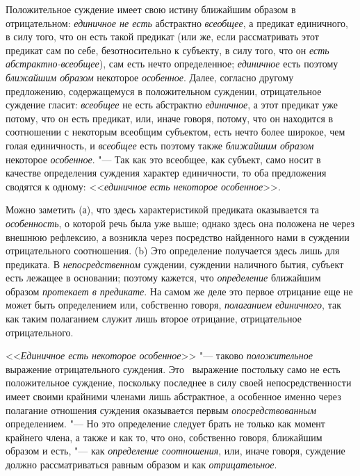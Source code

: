 {Положительное суждение имеет свою истину ближайшим образом в
отрицательном: {\em единичное не есть}
абстрактно
{\em всеобщее}, а
предикат единичного, в силу того, что он есть такой предикат (или же, если
рассматривать этот предикат сам по себе, безотносительно к субъекту, в силу
того, что он {\em есть
абстрактно-всеобщее}), сам есть нечто определенное;
{\em единичное} есть
поэтому {\em ближайшим образом}
некоторое
{\em особенное}. Далее,
согласно другому предложению, содержащемуся в положительном суждении,
отрицательное суждение гласит:
{\em всеобщее} не есть
абстрактно {\em единичное},
а этот предикат уже потому, что он есть предикат, или, иначе
говоря, потому, что он находится в соотношении с некоторым всеобщим
субъектом, есть нечто более широкое, чем голая единичность, и
{\em всеобщее} есть
поэтому также {\em ближайшим образом}
некоторое
{\em особенное}. "--- Так
как это всеобщее, как субъект, само носит в качестве определения суждения
характер единичности, то оба предложения сводятся к одному:
<<{\em единичное есть некоторое
особенное}>>.

Можно заметить (а), что здесь характеристикой предиката
оказывается та {\em особенность},
о которой речь была уже
выше;
однако здесь она положена не через внешнюю рефлексию, а
возникла через посредство найденного нами в суждении отрицательного
соотношения. (b) Это определение получается здесь лишь для предиката. В
{\em непосредственном}
суждении, суждении наличного бытия, субъект есть лежащее в
основании; поэтому кажется, что
{\em определение}
ближайшим образом
{\em протекает в предикате}.
На самом же деле это первое отрицание еще не может быть
определением или, собственно говоря,
{\em полаганием единичного},
так как таким полаганием служит лишь второе отрицание,
отрицательное отрицательного.

<<{\em Единичное есть некоторое
особенное}>> "--- таково
{\em положительное}
выражение отрицательного суждения. Это
\ выражение постольку само не есть положительное суждение,
поскольку последнее в силу своей непосредственности имеет своими крайними
членами лишь абстрактное, а особенное именно через полагание отношения
суждения оказывается первым
{\em опосредствованным}
определением. "--- Но это определение следует
брать не только как момент крайнего члена, а также и как то, что оно,
собственно говоря, ближайшим образом и есть, "--- как
{\em определение соотношения},
или, иначе говоря, суждение должно рассматриваться равным
образом и как {\em отрицательное}.

}
